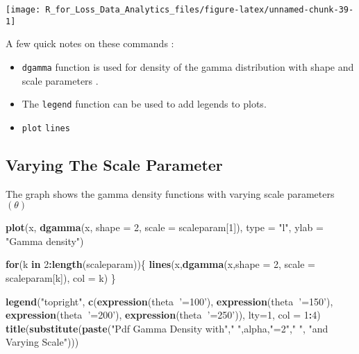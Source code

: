 \documentclass[]{book}
\newenvironment{Shaded}{\begin{snugshade}}{\end{snugshade}}
\newcommand{\KeywordTok}[1]{\textcolor[rgb]{0.13,0.29,0.53}{\textbf{#1}}}
\newcommand{\DataTypeTok}[1]{\textcolor[rgb]{0.13,0.29,0.53}{#1}}
\newcommand{\DecValTok}[1]{\textcolor[rgb]{0.00,0.00,0.81}{#1}}
\newcommand{\StringTok}[1]{\textcolor[rgb]{0.31,0.60,0.02}{#1}}
\newcommand{\ControlFlowTok}[1]{\textcolor[rgb]{0.13,0.29,0.53}{\textbf{#1}}}
\newcommand{\OperatorTok}[1]{\textcolor[rgb]{0.81,0.36,0.00}{\textbf{#1}}}
\newcommand{\NormalTok}[1]{#1}
\theoremstyle{definition}
\theoremstyle{definition}
\theoremstyle{definition}
\theoremstyle{remark}
\begin{document}
\begin{center}\texttt{[image: R\_for\_Loss\_Data\_Analytics\_files/figure-latex/unnamed-chunk-39-1]} \end{center}

A few quick notes on these commands :

\begin{itemize}
\item
  \texttt{dgamma} function is used for density of the gamma distribution
  with shape and scale parameters .
\item
  The \texttt{legend} function can be used to add legends to plots.
\item
  \texttt{plot} \texttt{lines}
\end{itemize}

\subsection{Varying The Scale
Parameter}\label{varying-the-scale-parameter}

The graph shows the gamma density functions with varying scale
parameters \((\theta)\)

\begin{Shaded}
\begin{Highlighting}[]
\KeywordTok{plot}\NormalTok{(x, }\KeywordTok{dgamma}\NormalTok{(x, }\DataTypeTok{shape =} \DecValTok{2}\NormalTok{, }\DataTypeTok{scale =}\NormalTok{ scaleparam[}\DecValTok{1}\NormalTok{]), }\DataTypeTok{type =} \StringTok{"l"}\NormalTok{, }\DataTypeTok{ylab =} \StringTok{"Gamma density"}\NormalTok{)}

\ControlFlowTok{for}\NormalTok{(k }\ControlFlowTok{in} \DecValTok{2}\OperatorTok{:}\KeywordTok{length}\NormalTok{(scaleparam))\{}
  \KeywordTok{lines}\NormalTok{(x,}\KeywordTok{dgamma}\NormalTok{(x,}\DataTypeTok{shape =} \DecValTok{2}\NormalTok{, }\DataTypeTok{scale =}\NormalTok{ scaleparam[k]), }\DataTypeTok{col =}\NormalTok{ k)}
\NormalTok{\}}

\KeywordTok{legend}\NormalTok{(}\StringTok{"topright"}\NormalTok{, }\KeywordTok{c}\NormalTok{(}\KeywordTok{expression}\NormalTok{(theta}\OperatorTok{~}\StringTok{'=100'}\NormalTok{), }\KeywordTok{expression}\NormalTok{(theta}\OperatorTok{~}\StringTok{'=150'}\NormalTok{), }\KeywordTok{expression}\NormalTok{(theta}\OperatorTok{~}\StringTok{'=200'}\NormalTok{), }\KeywordTok{expression}\NormalTok{(theta}\OperatorTok{~}\StringTok{'=250'}\NormalTok{)), }\DataTypeTok{lty=}\DecValTok{1}\NormalTok{, }\DataTypeTok{col =} \DecValTok{1}\OperatorTok{:}\DecValTok{4}\NormalTok{)}
\KeywordTok{title}\NormalTok{(}\KeywordTok{substitute}\NormalTok{(}\KeywordTok{paste}\NormalTok{(}\StringTok{"Pdf Gamma Density with"}\NormalTok{,}\StringTok{" "}\NormalTok{,alpha,}\StringTok{"=2"}\NormalTok{,}\StringTok{" "}\NormalTok{, }\StringTok{"and Varying Scale"}\NormalTok{)))}
\end{Highlighting}
\end{Shaded}
\end{document}
